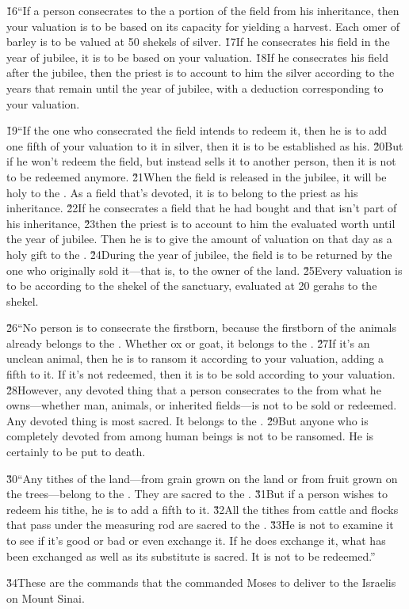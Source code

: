 \v{16}``If a person consecrates to the  a portion of the field from his inheritance, then your valuation is to be based on its capacity for yielding a harvest. Each omer of barley is to be valued at 50 shekels of silver. \v{17}If he consecrates his field in the year of jubilee, it is to be based on your valuation. \v{18}If he consecrates his field after the jubilee, then the priest is to account to him the silver according to the years that remain until the year of jubilee, with a deduction corresponding to your valuation.

\v{19}``If the one who consecrated the field intends to redeem it, then he is to add one fifth of your valuation to it in silver, then it is to be established as his. \v{20}But if he won't redeem the field, but instead sells it to another person, then it is not to be redeemed anymore. \v{21}When the field is released in the jubilee, it will be holy to the . As a field that's devoted, it is to belong to the priest as his inheritance. \v{22}If he consecrates a field that he had bought and that isn't part of his inheritance, \v{23}then the priest is to account to him the evaluated worth until the year of jubilee. Then he is to give the amount of valuation on that day as a holy gift to the . \v{24}During the year of jubilee, the field is to be returned by the one who originally sold it---that is, to the owner of the land. \v{25}Every valuation is to be according to the shekel of the sanctuary, evaluated at 20 gerahs to the shekel.

\v{26}``No person is to consecrate the firstborn, because the firstborn of the animals already belongs to the . Whether ox or goat, it belongs to the . \v{27}If it's an unclean animal, then he is to ransom it according to your valuation, adding a fifth to it. If it's not redeemed, then it is to be sold according to your valuation. \v{28}However, any devoted thing that a person consecrates to the  from what he owns---whether man, animals, or inherited fields---is not to be sold or redeemed. Any devoted thing is most sacred. It belongs to the . \v{29}But anyone who is completely devoted from among human beings is not to be ransomed. He is certainly to be put to death.

\v{30}``Any tithes of the land---from grain grown on the land or from fruit grown on the trees---belong to the . They are sacred to the . \v{31}But if a person wishes to redeem his tithe, he is to add a fifth to it. \v{32}All the tithes from cattle and flocks that pass under the measuring rod are sacred to the . \v{33}He is not to examine it to see if it's good or bad or even exchange it. If he does exchange it, what has been exchanged as well as its substitute is sacred. It is not to be redeemed.''

\v{34}These are the commands that the  commanded Moses to deliver to the Israelis on Mount Sinai.
